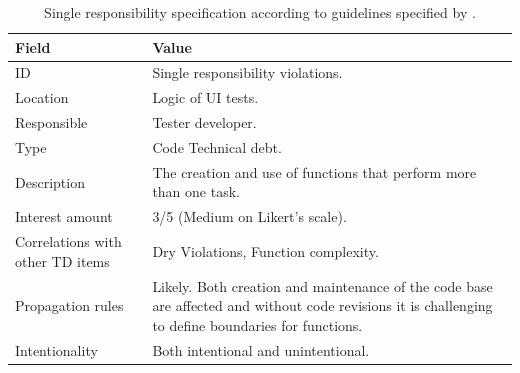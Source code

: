     	\begin{table}[!htbp]
		\centering
		\tabulinesep=1.2mm
		\begin{tabu} to \textwidth {|X|X[3]|}

			\hline
			\textbf{Field} & \textbf{Value} \\
			\hline

			ID & Single responsibility violations. \\
			\hline

			Location & Logic of UI tests. \\
			\hline

			Responsible & Tester developer. \\
			\hline

			Type & Code Technical debt. \\
			\hline

			Description & The creation and use of functions that perform more than one task.\\
			\hline



			Interest amount &  3/5 (Medium on Likert's scale). \\
			\hline



			Correlations with other TD items & Dry Violations, Function complexity. \\
			\hline



			Propagation rules & Likely. Both creation and maintenance of the code base are affected and without code revisions it is challenging to define boundaries for functions.\\
			\hline

			Intentionality & Both intentional and unintentional. \\
			\hline

		\end{tabu}
		\label{tab:res-single-responsibility}
		\caption[Single responsibility specification]{Single responsibility specification according to guidelines specified by \cite{mapping_study_td}.}
	\end{table}


